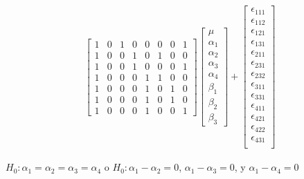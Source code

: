 \documentclass[12pt,a4paper]{report}
\begin{document}
\begin{align*}
\begin{bmatrix}
                1 & 0 & 1 & 0 & 0 & 0 & 0 & 1\\
                1 & 0 & 0 & 1 & 0 & 1 & 0 & 0\\
                1 & 0 & 0 & 1 & 0 & 0 & 0 & 1\\
                1 & 0 & 0 & 0 & 1 & 1 & 0 & 0\\
                1 & 0 & 0 & 0 & 1 & 0 & 1 & 0\\
                1 & 0 & 0 & 0 & 1 & 0 & 1 & 0\\
                1 & 0 & 0 & 0 & 1 & 0 & 0 & 1
\end{bmatrix}
\begin{bmatrix} \mu \\ \alpha_1 \\ \alpha_2 \\ \alpha_3 \\ \alpha_4 \\ \beta_1 \\ \beta_2 \\ \beta_3
\end{bmatrix}+
\begin{bmatrix} \epsilon_{111} \\
                \epsilon_{112} \\
                \epsilon_{121} \\
                \epsilon_{131} \\
                \epsilon_{211} \\
                \epsilon_{231} \\
                \epsilon_{232} \\
                \epsilon_{311} \\
                \epsilon_{331} \\
                \epsilon_{411} \\
                \epsilon_{421} \\
                \epsilon_{422} \\
                \epsilon_{431} \\
\end{bmatrix}
\end{align*}





$H_0 : \alpha_1 = \alpha_2 = \alpha_3 = \alpha_4$ o $H_0 : \alpha_1 - \alpha_2 =0$, $\alpha_1 - \alpha_3 =0$, y $\alpha_1 -\alpha_4=0$
\end{document}
